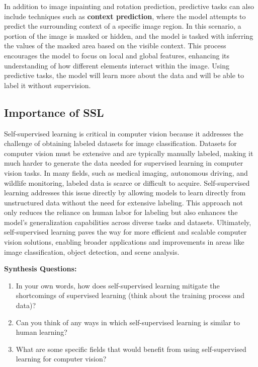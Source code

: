     In addition to image inpainting and rotation prediction, predictive tasks can also include techniques such as \textbf{context prediction}, where the model attempts to predict the surrounding context of a specific image region. In this scenario, a portion of the image is masked or hidden, and the model is tasked with inferring the values of the masked area based on the visible context. This process encourages the model to focus on local and global features, enhancing its understanding of how different elements interact within the image. Using predictive tasks, the model will learn more about the data and will be able to label it without supervision.
\subsection{Importance of SSL}
    \large Self-supervised learning is critical in computer vision because it addresses the challenge of obtaining labeled datasets for image classification. Datasets for computer vision must be extensive and are typically manually labeled, making it much harder to generate the data needed for supervised learning in computer vision tasks. In many fields, such as medical imaging, autonomous driving, and wildlife monitoring, labeled data is scarce or difficult to acquire. Self-supervised learning addresses this issue directly by allowing models to learn directly from unstructured data without the need for extensive labeling. This approach not only reduces the reliance on human labor for labeling but also enhances the model's generalization capabilities across diverse tasks and datasets. Ultimately, self-supervised learning paves the way for more efficient and scalable computer vision solutions, enabling broader applications and improvements in areas like image classification, object detection, and scene analysis.

\vspace{10bp}
\begin{questionbox}
    \textbf{Synthesis Questions:}
    \begin{enumerate}    
        \item In your own words, how does self-supervised learning mitigate the shortcomings of supervised learning (think about the training process and data)?
        \item Can you think of any ways in which self-supervised learning is similar to human learning?
        \item What are some specific fields that would benefit from using self-supervised learning for computer vision?
    \end{enumerate}
    \vspace{1bp}
\end{questionbox}

